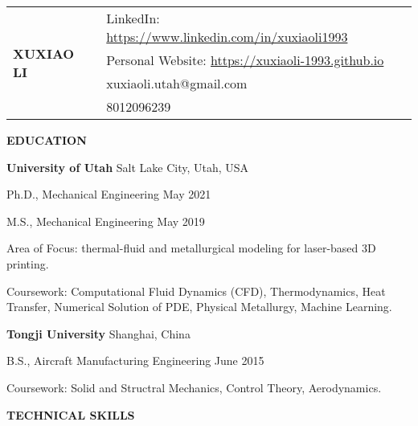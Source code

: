 \documentclass[11pt, letterpaper]{article}
\begin{document}
\begin{tabular}{@{} p{} p{} @{}}
   \multirow{4}{*}{{\textbf{\huge XUXIAO LI}}} & 
    LinkedIn: \href{https://www.linkedin.com/in/xuxiaoli1993}{https://www.linkedin.com/in/xuxiaoli1993} \\
     & Personal Website: \href{https://xuxiaoli-1993.github.io}{https://xuxiaoli-1993.github.io} \\
     & xuxiaoli.utah@gmail.com \\
     & 8012096239
\end{tabular}

\vspace{24pt}



\textbf{EDUCATION}

\fullrule

\textbf{University of Utah} \hfill Salt Lake City, Utah, USA

Ph.D., Mechanical Engineering  \hfill May 2021

M.S., Mechanical Engineering  \hfill May 2019

Area of Focus: thermal-fluid and metallurgical modeling for laser-based 3D printing.

Coursework: Computational Fluid Dynamics (CFD), Thermodynamics, Heat Transfer, Numerical Solution of
PDE, Physical Metallurgy, Machine Learning.

\vskip 6pt

\textbf{Tongji University} 
\hfill
Shanghai, China

B.S., Aircraft Manufacturing Engineering \hfill June 2015

Coursework: Solid and Structral Mechanics, Control Theory, Aerodynamics.

\vskip 9pt

\textbf{TECHNICAL SKILLS}
\end{document}
